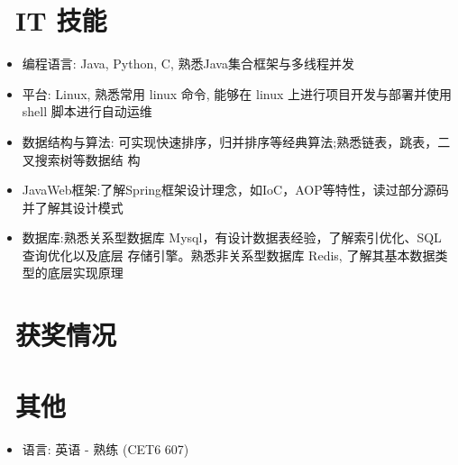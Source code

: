 \documentclass{resume}
\begin{document}
\section{\faCogs\ IT 技能}
\begin{itemize}[parsep=0.5ex]
  \item 编程语言: Java, Python, C, 熟悉Java集合框架与多线程并发
  \item 平台: Linux, 熟悉常用 linux 命令, 能够在 linux 上进行项目开发与部署并使用 shell 脚本进行自动运维
  \item 数据结构与算法: 可实现快速排序，归并排序等经典算法;熟悉链表，跳表，二叉搜索树等数据结 构
  \item JavaWeb框架:了解Spring框架设计理念，如IoC，AOP等特性，读过部分源码并了解其设计模式
  \item 数据库:熟悉关系型数据库 Mysql，有设计数据表经验，了解索引优化、SQL 查询优化以及底层
 存储引擎。熟悉非关系型数据库 Redis, 了解其基本数据类型的底层实现原理
\end{itemize}

\section{\faHeartO\ 获奖情况}

\section{\faInfo\ 其他}
\begin{itemize}[parsep=0.5ex]
  \item 语言: 英语 - 熟练 (CET6 607)
\end{itemize}

%
%
\end{document}

